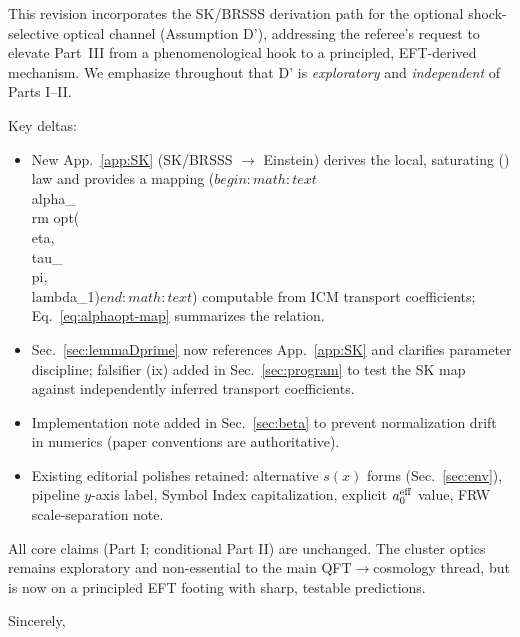 \documentclass[aps,prd,onecolumn,superscriptaddress,nofootinbib]{revtex4-2}
\def\alpha{alpha}%
\def\alpha_M{alphaM}%
\begin{document}
This revision incorporates the SK/BRSSS derivation path for the optional shock-selective optical channel (Assumption D$’$), addressing the referee’s request to elevate Part~III from a phenomenological hook to a principled, EFT-derived mechanism. We emphasize throughout that D$’$ is \emph{exploratory} and \emph{independent} of Parts I–II.

Key deltas:
\begin{itemize}
\item New App.~\ref{app:SK} (SK/BRSSS $\to$ Einstein) derives the local, saturating (\Sigma) law and provides a mapping ($begin:math:text$\\alpha_{\\rm opt}(\\eta,\\tau_\\pi,\\lambda_1)$end:math:text$) computable from ICM transport coefficients; Eq.~\eqref{eq:alphaopt-map} summarizes the relation.
\item Sec.~\ref{sec:lemmaDprime} now references App.~\ref{app:SK} and clarifies parameter discipline; falsifier (ix) added in Sec.~\ref{sec:program} to test the SK map against independently inferred transport coefficients.
\item Implementation note added in Sec.~\ref{sec:beta} to prevent normalization drift in numerics (paper conventions are authoritative).
\item Existing editorial polishes retained: alternative $s(x)$ forms (Sec.~\ref{sec:env}), pipeline $y$-axis label, Symbol Index capitalization, explicit $a_0^{\rm eff}$ value, FRW scale-separation note.
\end{itemize}

All core claims (Part I; conditional Part II) are unchanged. The cluster optics remains exploratory and non-essential to the main QFT$\to$cosmology thread, but is now on a principled EFT footing with sharp, testable predictions.

Sincerely,\\
[Authors]
\fi
\end{document}
